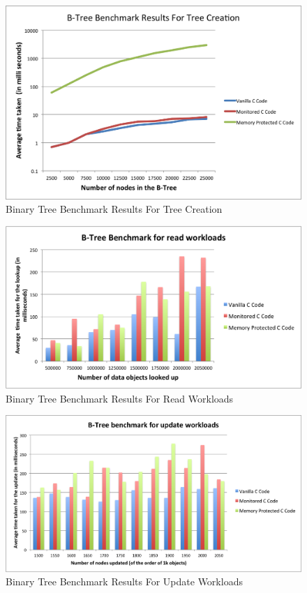 \begin{figure}[!h]
\caption{Binary Tree Benchmark Results For Tree Creation}
\label{fig:create}
\includegraphics[scale=0.4]{./images/create.png}
\end{figure}
\begin{figure}[!h]
\caption{Binary Tree Benchmark Results For Read Workloads}
\label{fig:read}
\includegraphics[scale=0.4]{./images/read.png}
\end{figure}
\begin{figure}[!h]
\caption{Binary Tree Benchmark Results For Update Workloads}
\label{fig:update}
\includegraphics[scale=0.33]{./images/update.png}
\end{figure}
  

